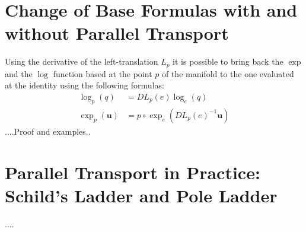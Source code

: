 \section{Change of Base Formulas with and without Parallel Transport}
Using the derivative of the left-translation $L_{p}$ it is possible to bring back the $\exp$ and the $\log$ function based at the point $p$ of the manifold to the one evaluated at the identity using the following formulas:
\begin{align*}
	\log _{p}(q)  &= DL_{p}(e) \log _{e}(q)  \\
	\exp _{p}(\mathbf{u})  &= p\circ \exp_{e} (DL_{p}(e)^{-1} \mathbf{u})
\end{align*}
....Proof and examples..


\section{Parallel Transport in Practice: Schild's Ladder and Pole Ladder}

....